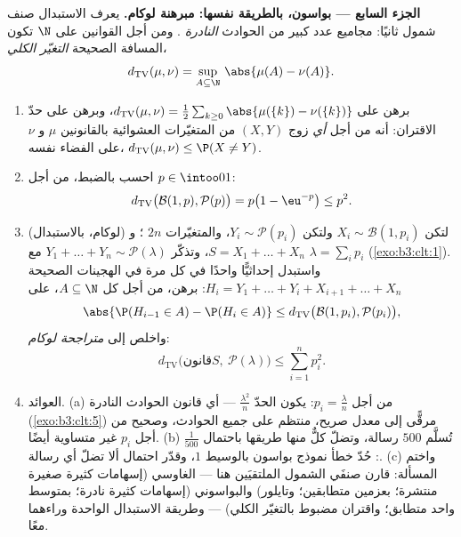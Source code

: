 \begin{problem}
\medskip
\noindent\textbf{الجزء السابع --- بواسون، بالطريقة نفسها:
مبرهنة لوكام.} يعرف الاستبدال صنف شمول ثانيًا: مجاميع عدد كبير
من الحوادث \emph{النادرة} . ومن أجل القوانين على $\N$
تكون المسافة الصحيحة \emph{التغيّر الكلي}،
\[
d_{\mathrm{TV}}(\mu, \nu) = \sup_{A\subseteq\N}\,
\abs{\mu(A) - \nu(A)} .
\]
\begin{enumerate}[resume]
  \item برهن على $d_{\mathrm{TV}}(\mu, \nu) =
        \frac12\sum_{k\geq0}\abs{\mu(\{k\}) -
        \nu(\{k\})}$، وبرهن على حدّ الاقتران: أنه من أجل
        \emph{أي} زوج $(X, Y)$ من المتغيّرات العشوائية
        بالقانونين $\mu$ و $\nu$ على الفضاء نفسه، $d_{\mathrm{TV}}(\mu, \nu) \leq \P(X \neq Y)$.
  \item احسب بالضبط، من أجل $p \in \intoo01$:
        \[
        d_{\mathrm{TV}}\bigl(\mathcal B(1, p), \mathcal
        P(p)\bigr) = p\bigl(1 - \eu^{-p}\bigr) \leq p^2 .
        \]
  \item (لوكام، بالاستبدال) لتكن $X_i \sim \mathcal B(1,
        p_i)$ ولتكن $Y_i \sim \mathcal P(p_i)$،
        والمتغيّرات $2n$ ؛ و $S = X_1 + \dots + X_n$، وتذكّر $Y_1 + \dots + Y_n \sim \mathcal P(\lambda)$ مع
        $\lambda = \sum_ip_i$ (\cref{exo:b3:clt:1}). واستبدل إحداثيًّا واحدًا في كل
        مرة في الهجينات الصحيحة $H_i = Y_1 + \dots + Y_i + X_{i+1} + \dots
        + X_n$: برهن، من أجل كل
        $A \subseteq \N$، على
        \[
        \abs{\P(H_{i-1} \in A) - \P(H_i \in A)} \leq
        d_{\mathrm{TV}}\bigl(\mathcal B(1, p_i), \mathcal
        P(p_i)\bigr),
        \]
        واخلص إلى \emph{متراجحة لوكام}:
        \[
        d_{\mathrm{TV}}\bigl(\text{قانون} S,\ \mathcal
        P(\lambda)\bigr) \leq \sum_{i=1}^np_i^2 .
        \]
  \item العوائد. (a) من أجل $p_i = \frac\lambda n$: يكون الحدّ $\frac{\lambda^2}n$ --- أي
        قانون الحوادث النادرة (\cref{exo:b3:clt:5}) مرقًّى إلى معدل
        صريح، منتظم على جميع الحوادث، وصحيح من أجل $p_i$ غير
        متساوية أيضًا. (b) تُسلَّم $500$ رسالة، وتضلّ كلٌّ منها
        طريقها  باحتمال $\frac1{500}$: حُدّ خطأ نموذج
        بواسون بالوسيط $1$، وقدّر احتمال ألا تضلّ أي رسالة.
        (c) واختم المسألة: قارن صنفَي الشمول الملتقيَين هنا ---
        الغاوسي (إسهامات كثيرة صغيرة منتشرة؛ بعزمين متطابقين؛
        وتايلور) والبواسوني (إسهامات كثيرة نادرة؛ بمتوسط واحد
        متطابق؛ واقتران مضبوط بالتغيّر الكلي) --- وطريقة
        الاستبدال الواحدة وراءهما معًا.


\end{enumerate}
\end{problem}
